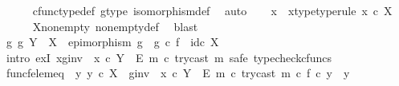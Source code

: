 \begin{isabellebody}
\ \ \ \ \isamarkupfalse%
\ cfunc{\isacharunderscore}{\kern0pt}type{\isacharunderscore}{\kern0pt}def\ g{\isacharunderscore}{\kern0pt}type\ isomorphism{\isacharunderscore}{\kern0pt}def\ \isamarkupfalse%
\ auto\isanewline
\isanewline
\ \ \isamarkupfalse%
\ x\ \ x{\isacharunderscore}{\kern0pt}type{\isacharbrackleft}{\kern0pt}type{\isacharunderscore}{\kern0pt}rule{\isacharbrackright}{\kern0pt}{\isacharcolon}{\kern0pt}\ {\isachardoublequoteopen}x\ {\isasymin}\isactrlsub c\ X{\isachardoublequoteclose}\isanewline
\ \ \ \ \isamarkupfalse%
\ X{\isacharunderscore}{\kern0pt}nonempty\ nonempty{\isacharunderscore}{\kern0pt}def\ \isamarkupfalse%
\ blast\isanewline
\isanewline
\ \ \isamarkupfalse%
\ {\isachardoublequoteopen}{\isasymexists}g{\isachardot}{\kern0pt}\ g{\isacharcolon}{\kern0pt}\ Y\ {\isasymrightarrow}\ X\ {\isasymand}\ epimorphism\ g\ {\isasymand}\ g\ {\isasymcirc}\isactrlsub c\ f\ {\isacharequal}{\kern0pt}\ id\isactrlsub c\ X{\isachardoublequoteclose}\isanewline
\ \ \isamarkupfalse%
\ {\isacharparenleft}{\kern0pt}intro\ exI{\isacharbrackleft}{\kern0pt}\ x{\isacharequal}{\kern0pt}{\isachardoublequoteopen}{\isacharparenleft}{\kern0pt}g{\isacharunderscore}{\kern0pt}inv\ {\isasymamalg}\ {\isacharparenleft}{\kern0pt}x\ {\isasymcirc}\isactrlsub c\ {\isasymbeta}\isactrlbsub Y\ {\isasymsetminus}\ {\isacharparenleft}{\kern0pt}E{\isacharcomma}{\kern0pt}\ m{\isacharparenright}{\kern0pt}\isactrlesub {\isacharparenright}{\kern0pt}{\isacharparenright}{\kern0pt}\ {\isasymcirc}\isactrlsub c\ try{\isacharunderscore}{\kern0pt}cast\ m{\isachardoublequoteclose}{\isacharbrackright}{\kern0pt}{\isacharcomma}{\kern0pt}\ safe{\isacharcomma}{\kern0pt}\ typecheck{\isacharunderscore}{\kern0pt}cfuncs{\isacharparenright}{\kern0pt}\isanewline
\ \ \ \ \isamarkupfalse%
\ func{\isacharunderscore}{\kern0pt}f{\isacharunderscore}{\kern0pt}elem{\isacharunderscore}{\kern0pt}eq{\isacharcolon}{\kern0pt}\ {\isachardoublequoteopen}{\isasymAnd}\ y{\isachardot}{\kern0pt}\ y\ {\isasymin}\isactrlsub c\ X\ {\isasymLongrightarrow}\ {\isacharparenleft}{\kern0pt}g{\isacharunderscore}{\kern0pt}inv\ {\isasymamalg}\ {\isacharparenleft}{\kern0pt}x\ {\isasymcirc}\isactrlsub c\ {\isasymbeta}\isactrlbsub Y\ {\isasymsetminus}\ {\isacharparenleft}{\kern0pt}E{\isacharcomma}{\kern0pt}\ m{\isacharparenright}{\kern0pt}\isactrlesub {\isacharparenright}{\kern0pt}\ {\isasymcirc}\isactrlsub c\ try{\isacharunderscore}{\kern0pt}cast\ m{\isacharparenright}{\kern0pt}\ {\isasymcirc}\isactrlsub c\ f\ {\isasymcirc}\isactrlsub c\ y\ {\isacharequal}{\kern0pt}\ y{\isachardoublequoteclose}\isanewline

\end{isabellebody}
